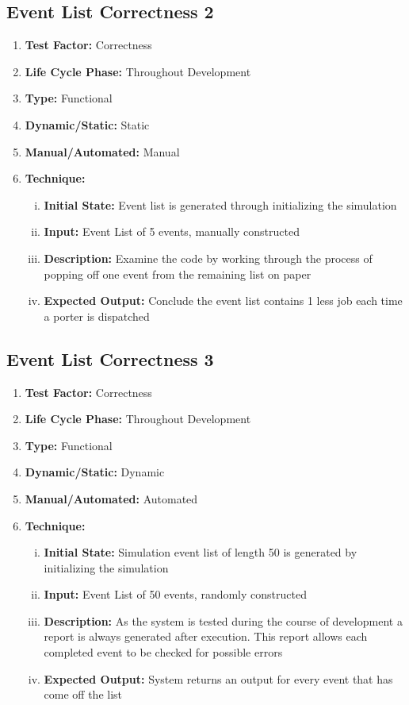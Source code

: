 \documentclass[paper=letter, fontsize=10pt]{scrartcl}
\numberwithin{equation}{section}		%
\numberwithin{figure}{section}			%
\numberwithin{table}{section}				%
\begin{document}
\subsection{Event List Correctness 2}
\begin{enumerate}[]
	\item \textbf{Test Factor:} Correctness
	\item \textbf{Life Cycle Phase:} Throughout Development
	\item \textbf{Type:} Functional
	\item \textbf{Dynamic/Static:} Static
	\item \textbf{Manual/Automated:} Manual
	\item \textbf{Technique:} 
		\begin{enumerate}[(i)]
			\item \textbf{Initial State:} Event list is generated through initializing the simulation			
			\item \textbf{Input:} Event List of 5 events, manually constructed
			\item \textbf{Description:} Examine the code by working through the process of popping off one event from the remaining list on paper
			\item \textbf{Expected Output:} Conclude the event list contains 1 less job each time a porter is dispatched
		\end{enumerate}
\end{enumerate}

\subsection{Event List Correctness 3}
\begin{enumerate}[]
	\item \textbf{Test Factor:} Correctness
	\item \textbf{Life Cycle Phase:} Throughout Development
	\item \textbf{Type:} Functional
	\item \textbf{Dynamic/Static:} Dynamic
	\item \textbf{Manual/Automated:} Automated
	\item \textbf{Technique:} 
		\begin{enumerate}[(i)]
			\item \textbf{Initial State:} Simulation event list of length 50 is generated by initializing the simulation	
			\item \textbf{Input:} Event List of 50 events, randomly constructed
			\item \textbf{Description:} As the system is tested during the course of development a report is always generated after execution. This report allows each completed event to be checked for possible errors
			\item \textbf{Expected Output:} System returns an output for every event that has come off the list
		\end{enumerate}
\end{enumerate}
\end{document}

